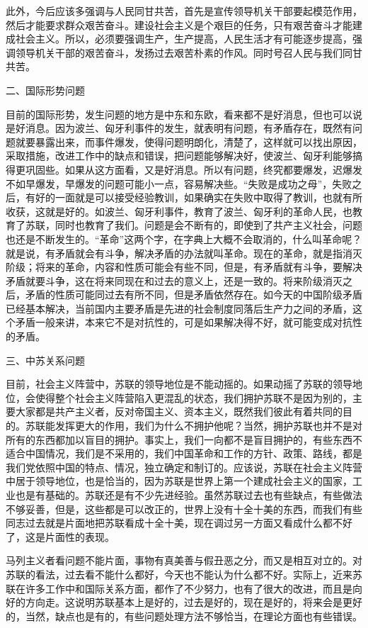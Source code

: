 此外，今后应该多强调与人民同甘共苦，首先是宣传领导机关干部要起模范作用，然后才能要求群众艰苦奋斗。建设社会主义是个艰巨的任务，只有艰苦奋斗才能建成社会主义。所以，必须要强调生产，生产提高，人民生活才有可能逐步提高，强调领导机关干部的艰苦奋斗，发扬过去艰苦朴素的作风。同时号召人民与我们同甘共苦。

二、国际形势问题

目前的国际形势，发生问题的地方是中东和东欧，看来都不是好消息，但也可以说是好消息。因为波兰、匈牙利事件的发生，就表明有问题，有矛盾存在，既然有问题就要暴露出来，而事件爆发，使得问题明朗化，清楚了，这样就可以找出原因，采取措施，改进工作中的缺点和错误，把问题能够解决好，使波兰、匈牙利能够搞得更巩固些。如果从这方面看，又是好消息。所以有问题，终究都要爆发，迟爆发不如早爆发，早爆发的问题可能小一点，容易解决些。“失败是成功之母”，失败之后，有好的一面就是可以接受经验教训，如果确实在失败中取得了教训，也就有所收获，这就是好的。如波兰、匈牙利事件，教育了波兰、匈牙利的革命人民，也教育了苏联，同时也教育了我们。问题是会不断有的，即使到了共产主义社会，问题也还是不断发生的。“革命”这两个字，在字典上大概不会取消的，什么叫革命呢？就是说，有矛盾就会有斗争，解决矛盾的办法就叫革命。现在的革命，就是指消灭阶级；将来的革命，内容和性质可能会有些不同，但是，有矛盾就有斗争，要解决矛盾就要斗争，这在将来同现在和过去的意义上，还是一致的。将来阶级消灭之后，矛盾的性质可能同过去有所不同，但是矛盾依然存在。如今天的中国阶级矛盾已经基本解决，当前国内主要矛盾是先进的社会制度同落后生产力之间的矛盾，这个矛盾一般来讲，本来它不是对抗性的，可是如果解决得不好，就可能变成对抗性的矛盾。

三、中苏关系问题

目前，社会主义阵营中，苏联的领导地位是不能动摇的。如果动摇了苏联的领导地位，会使得整个社会主义阵营陷入更混乱的状态，我们拥护苏联不是因为别的，主要大家都是共产主义者，反对帝国主义、资本主义，既然我们彼此有着共同的目的。苏联能发挥更大的作用，我们为什么不拥护他呢？当然，拥护苏联也并不是对所有的东西都加以盲目的拥护。事实上，我们一向都不是盲目拥护的，有些东西不适合中国情况，我们是不采用的，我们中国革命和工作的方针、政策、路线，都是我们党依照中国的特点、情况，独立确定和制订的。应该说，苏联在社会主义阵营中居于领导地位，也是恰当的，因为苏联是世界上第一个建成社会主义的国家，工业也是有基础的。苏联还是有不少先进经验。虽然苏联过去也有些缺点，有些做法不够妥善，但是，这些都是可以改正的，世界上没有十全十美的东西，而我们有些同志过去就是片面地把苏联看成十全十美，现在调过另一方面又看成什么都不好了，这是片面性的表现。

马列主义者看问题不能片面，事物有真美善与假丑恶之分，而又是相互对立的。对苏联的看法，过去看不能什么都好，今天也不能认为什么都不好。实际上，近来苏联在许多工作中和国际关系方面，都作了不少努力，也有了很大的改进，而且是向好的方向走。这说明苏联基本上是好的，过去是好的，现在是好的，将来会是更好的，当然，缺点也是有的，有些问题处理方法不够恰当，在理论方面也有些错误。

